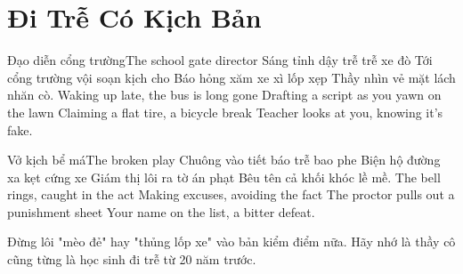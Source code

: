 \chapter{Đi Trễ Có Kịch Bản}

\begin{tutuyetbox}{Đạo diễn cổng trường}{The school gate director}
Sáng tỉnh dậy trễ trễ xe đò
Tới cổng trường vội soạn kịch cho
Báo hỏng xăm xe xì lốp xẹp
Thầy nhìn vẻ mặt lách nhăn cò.
\tcblower
Waking up late, the bus is long gone 
Drafting a script as you yawn on the lawn 
Claiming a flat tire, a bicycle break 
Teacher looks at you, knowing it's fake.
\end{tutuyetbox}

\begin{tutuyetbox}{Vở kịch bể má}{The broken play}
Chuông vào tiết báo trễ bao phe
Biện hộ đường xa kẹt cứng xe
Giám thị lôi ra tờ án phạt
Bêu tên cả khối khóc lề mề.
\tcblower
The bell rings, caught in the act 
Making excuses, avoiding the fact 
The proctor pulls out a punishment sheet 
Your name on the list, a bitter defeat.
\end{tutuyetbox}

\begin{ghichu}
Đừng lôi "mèo đẻ" hay "thủng lốp xe" vào bản kiểm điểm nữa. Hãy nhớ là thầy cô cũng từng là học sinh đi trễ từ 20 năm trước.
\end{ghichu}
